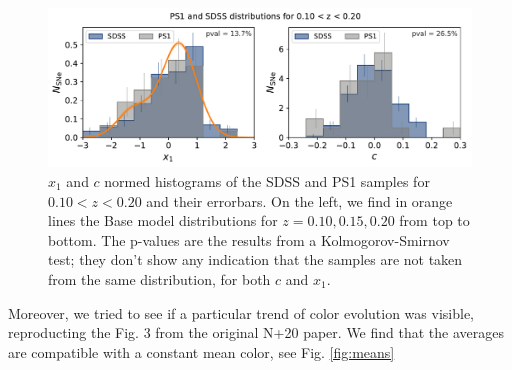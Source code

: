 \documentclass[11pt,a4paper]{paper}
\begin{document}
\begin{figure}[htbp!]
    \centering
    \includegraphics[width=\linewidth]{Answer_figures/both-cut_SDSS_PS1-010-020.pdf}
    \captionsetup{justification=centering}
    \caption{$x_1$ and $c$ normed histograms of the SDSS and PS1 samples for
        $0.10 < z < 0.20$ and their errorbars. On the left, we find in orange
        lines the Base model distributions for $z = 0.10, 0.15, 0.20$ from top
        to bottom. The p-values are the results from a Kolmogorov-Smirnov test;
    they don't show any indication that the samples are not taken from the same
distribution, for both $c$ and $x_1$.}
\label{fig:distrib}
\end{figure}

Moreover, we tried to see if a particular trend of color evolution was visible,
reproducting the Fig. 3 from the original N+20 paper. We find that the averages
are compatible with a constant mean color, see Fig. \ref{fig:means}
\end{document}
